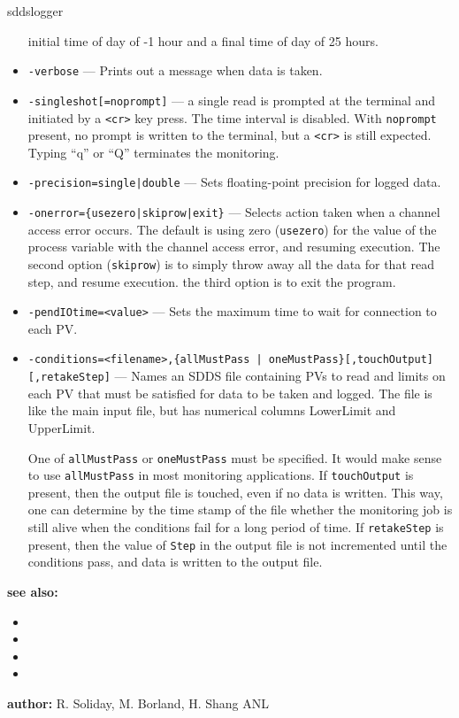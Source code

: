 \begin{sddsprog}{sddslogger}
\begin{itemize}
      initial time of day of -1 hour and a final time of day of 25 hours.
  \item {\tt -verbose} --- Prints out a message when data is taken.
  \item {\verb+-singleshot[=noprompt]+} --- a single read is prompted at the terminal
      and initiated by a \verb+<cr>+ key press. The time interval is disabled.
      With \verb+noprompt+ present, no prompt is written to the terminal, but a \verb+<cr>+
      is still expected. Typing ``q'' or ``Q'' terminates the monitoring.
  \item {\tt -precision={single|double}} --- Sets floating-point precision for logged data.
  \item {\tt -onerror=\{usezero|skiprow|exit\}} --- Selects action taken when a channel access error occurs.
      The default is using zero ({\tt usezero}) for the value of the process variable
      with the channel access error, and resuming execution. The second option ({\tt skiprow}) is to
      simply throw away all the data for that read step, and resume execution.
      the third option is to exit the program.
  \item {\tt -pendIOtime=<value>} --- Sets the maximum time to wait for connection to each PV.
  \item {\verb+-conditions=<filename>,{allMustPass | oneMustPass}[,touchOutput][,retakeStep]+} ---
      Names an SDDS file containing PVs to read and limits on each PV that must
      be satisfied for data to be taken and logged.  The file is like the main
      input file, but has numerical columns LowerLimit and UpperLimit.

      One of \verb+allMustPass+ or \verb+oneMustPass+ must be specified. It would make sense
      to use \verb+allMustPass+ in most monitoring applications.
      If \verb+touchOutput+ is present, then the output file is touched, even if no data
      is written. This way, one can determine by the time stamp of the file
      whether the monitoring job is still alive
      when the conditions fail for a long period of time. If \verb+retakeStep+ is
      present, then the value of \verb+Step+ in the output file is not
      incremented until the conditions pass, and data is written to the output file.
\end{itemize}

\item \textbf{see also:}
\begin{itemize}
  \item {}
  \item {}
  \item {}
  \item {}
\end{itemize}
\item \textbf{author:} R. Soliday, M. Borland, H. Shang ANL
\end{sddsprog}
